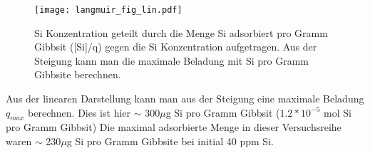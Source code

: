 \documentclass[12pt]{amsart}
\begin{document}
\begin{figure}[htbp]
\begin{center}
\texttt{[image: langmuir\_fig\_lin.pdf]}
\caption{Si Konzentration geteilt durch die Menge Si adsorbiert pro Gramm Gibbsit ([Si]/q) gegen die Si Konzentration aufgetragen. Aus der Steigung kann man die maximale Beladung mit Si pro Gramm Gibbsite berechnen. }
\label{default}
\end{center}
\end{figure}

Aus der linearen Darstellung kann man aus der Steigung  eine maximale Beladung $q_{max}$ berechnen.
Dies ist hier $\sim$ 300$\mu$g Si pro Gramm Gibbsit ($1.2*10^{-5}$ mol Si pro Gramm Gibbsit)
Die maximal adsorbierte Menge in dieser Versuchsreihe waren  $\sim$ 230$\mu$g Si pro Gramm Gibbsite bei initial 40 ppm Si.
\end{document}
